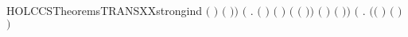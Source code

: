 \begin{SaveVerbatim}{HOLCCSTheoremsTRANSXXstrongind}
             \HOLTokenTransBegin{}\HOLTokenTransEnd {} \HOLSymConst{\HOLTokenConj{}}     \HOLSymConst{\HOLTokenImp{}}
             \ensuremath{(} \HOLSymConst{\ensuremath{\mid}} \ensuremath{)}  \ensuremath{(} \HOLSymConst{\ensuremath{\mid}} \ensuremath{)}\ensuremath{)} \HOLSymConst{\HOLTokenConj{}}
       \ensuremath{(}\HOLSymConst{\HOLTokenForall{}}    .
             \HOLTokenTransBegin{} \HOLTokenTransEnd {} \HOLSymConst{\HOLTokenConj{}}   \ensuremath{(} \ensuremath{)}  \HOLSymConst{\HOLTokenConj{}}
             \HOLTokenTransBegin{} \ensuremath{(} \ensuremath{)}\HOLTokenTransEnd {} \HOLSymConst{\HOLTokenConj{}}
              \ensuremath{(} \ensuremath{(} \ensuremath{)}\ensuremath{)}  \HOLSymConst{\HOLTokenImp{}}
             \ensuremath{(} \HOLSymConst{\ensuremath{\mid}} \ensuremath{)} \HOLConst{\ensuremath{\tau}} \ensuremath{(} \HOLSymConst{\ensuremath{\mid}} \ensuremath{)}\ensuremath{)} \HOLSymConst{\HOLTokenConj{}}
       \ensuremath{(}\HOLSymConst{\HOLTokenForall{}}    .
             \HOLTokenTransBegin{}\HOLTokenTransEnd {} \HOLSymConst{\HOLTokenConj{}}     \HOLSymConst{\HOLTokenConj{}}
            \ensuremath{(}\ensuremath{(} \HOLSymConst{\ensuremath{=}} \HOLConst{\ensuremath{\tau}}\ensuremath{)} \HOLSymConst{\HOLTokenDisj{}} \ensuremath{(} \HOLSymConst{\ensuremath{=}}  \ensuremath{)} \HOLSymConst{\HOLTokenConj{}}  \HOLConst{\HOLTokenNotIn{}}  \HOLSymConst{\HOLTokenConj{}}   \HOLConst{\HOLTokenNotIn{}} \ensuremath{)} \HOLSymConst{\HOLTokenImp{}}

\end{SaveVerbatim}
